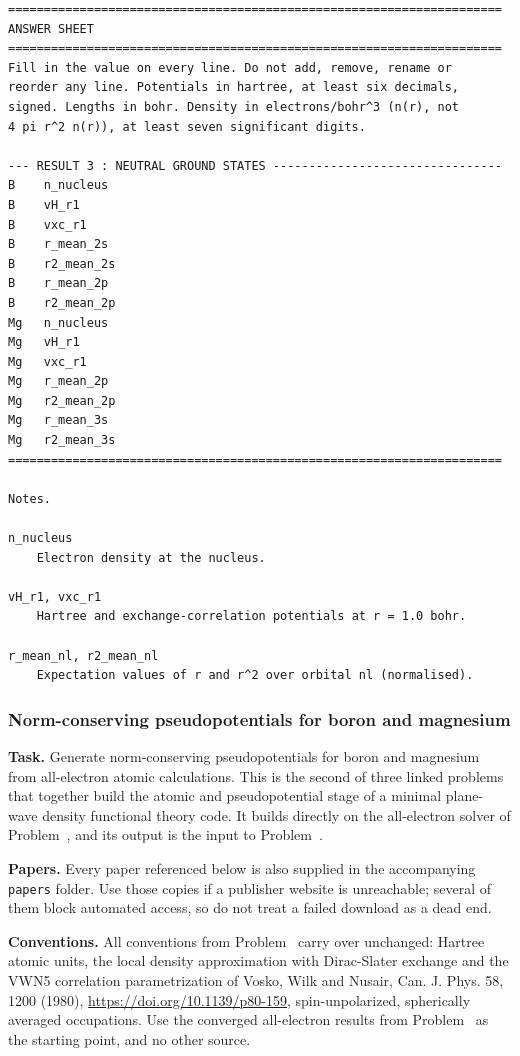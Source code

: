 \begin{lstlisting}
=====================================================================
ANSWER SHEET
=====================================================================
Fill in the value on every line. Do not add, remove, rename or
reorder any line. Potentials in hartree, at least six decimals,
signed. Lengths in bohr. Density in electrons/bohr^3 (n(r), not
4 pi r^2 n(r)), at least seven significant digits.

--- RESULT 3 : NEUTRAL GROUND STATES --------------------------------
B    n_nucleus
B    vH_r1
B    vxc_r1
B    r_mean_2s
B    r2_mean_2s
B    r_mean_2p
B    r2_mean_2p
Mg   n_nucleus
Mg   vH_r1
Mg   vxc_r1
Mg   r_mean_2p
Mg   r2_mean_2p
Mg   r_mean_3s
Mg   r2_mean_3s
=====================================================================

Notes.

n_nucleus
    Electron density at the nucleus.

vH_r1, vxc_r1
    Hartree and exchange-correlation potentials at r = 1.0 bohr.

r_mean_nl, r2_mean_nl
    Expectation values of r and r^2 over orbital nl (normalised).

\end{lstlisting}

\subsubsection{Norm-conserving pseudopotentials for boron and magnesium}
\label{problem:norm-conserving-pseudopotentials}
\textbf{Task.} Generate norm-conserving pseudopotentials for boron and magnesium from all-electron atomic
calculations. This is the second of three linked problems that together build the atomic and pseudopotential
stage of a minimal plane-wave density functional theory code. It builds directly on the all-electron solver of
Problem~, and its output is the input to Problem~. 

\textbf{Papers.} Every paper referenced below is also supplied in the accompanying \texttt{papers} folder. Use
those copies if a publisher website is unreachable; several of them block automated access, so do not treat a
failed download as a dead end.

\textbf{Conventions.} All conventions from Problem~ carry over unchanged: Hartree atomic units, the local
density approximation with Dirac-Slater exchange and the VWN5 correlation parametrization of Vosko, Wilk and
Nusair, Can. J. Phys. 58, 1200 (1980), \url{https://doi.org/10.1139/p80-159}, spin-unpolarized, spherically
averaged occupations. Use the converged all-electron results from Problem~ as the starting point, and no
other source.

